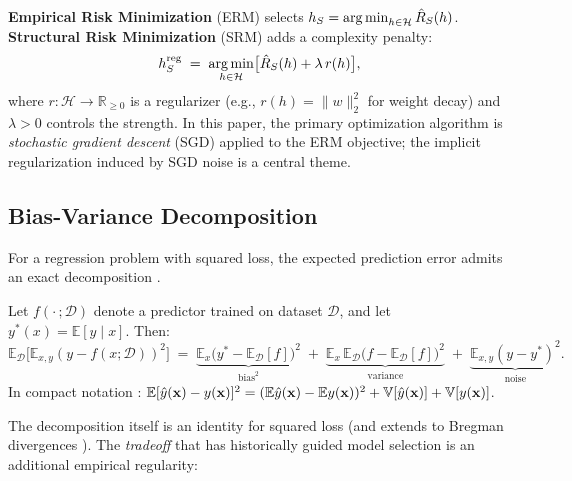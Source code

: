 \documentclass[
  journal=largetwo,
  year=2025,
  volume=37,
]{cup-journal}
\begin{document}
\begin{definition}\label{def:erm_srm}
\textbf{Empirical Risk Minimization} (ERM) selects $h_S = \operatorname*{arg\,min}_{h\in\mathcal{H}}\hat{R}_S(h)$.
\textbf{Structural Risk Minimization} (SRM) adds a complexity penalty:
\begin{equation}\label{eq:srm}
    h_S^{\mathrm{reg}} \;=\; \operatorname*{arg\,min}_{h\in\mathcal{H}}\bigl[\hat{R}_S(h)+\lambda\, r(h)\bigr],
\end{equation}
where $r:\mathcal{H}\to\mathbb{R}_{\geq 0}$ is a regularizer (e.g., $r(h)=\|w\|_2^2$ for weight decay) and $\lambda>0$ controls the strength. In this paper, the primary optimization algorithm is \textit{stochastic gradient descent} (SGD) applied to the ERM objective; the implicit regularization induced by SGD noise is a central theme.
\end{definition}

\subsection{Bias-Variance Decomposition}

For a regression problem with squared loss, the expected prediction error admits an exact decomposition \cite{6797087}.

\begin{theorem}\label{thm:bv_decomp}
Let $f(\cdot\,;\mathcal{D})$ denote a predictor trained on dataset $\mathcal{D}$, and let $y^{*}(x)=\mathbb{E}[y\mid x]$. Then:
\begin{equation}\label{eq:bv_decomp}
    \mathbb{E}_{\mathcal{D}}\!\bigl[\mathbb{E}_{x,y}(y-f(x;\mathcal{D}))^2\bigr]
    \;=\;
    \underbrace{\mathbb{E}_x\bigl(y^*\!-\mathbb{E}_{\mathcal{D}}[f]\bigr)^{2}}_{\text{bias}^2}
    \;+\;
    \underbrace{\mathbb{E}_x\,\mathbb{E}_{\mathcal{D}}\bigl(f-\mathbb{E}_{\mathcal{D}}[f]\bigr)^{2}}_{\text{variance}}
    \;+\;
    \underbrace{\mathbb{E}_{x,y}(y-y^*)^2}_{\text{noise}}.
\end{equation}
In compact notation \cite{adlam2020understandingdoubledescentrequires}:
$\mathbb{E}[\hat{y}(\mathbf{x})-y(\mathbf{x})]^2 = (\mathbb{E}\hat{y}(\mathbf{x})-\mathbb{E} y(\mathbf{x}))^2 + \mathbb{V}[\hat{y}(\mathbf{x})] + \mathbb{V}[y(\mathbf{x})]$.
\end{theorem}

The decomposition itself is an identity for squared loss (and extends to Bregman divergences \cite{PfauBregmanDivergence}). The \textit{tradeoff} that has historically guided model selection is an additional empirical regularity:
\end{document}
